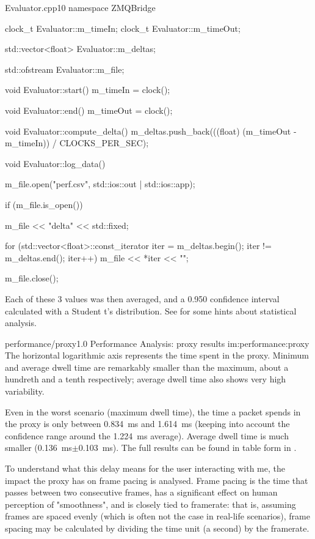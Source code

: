 \begin{codelist}{Evaluator.cpp}{10}
namespace ZMQBridge {

clock_t Evaluator::m_timeIn;
clock_t Evaluator::m_timeOut;

std::vector<float> Evaluator::m_deltas;

std::ofstream Evaluator::m_file;

void Evaluator::start() {
    m_timeIn = clock();
}

void Evaluator::end() {
    m_timeOut = clock();
}

void Evaluator::compute_delta() {
    m_deltas.push_back(((float) (m_timeOut - m_timeIn)) / CLOCKS_PER_SEC);
}

void Evaluator::log_data() {
    m_file.open("perf.csv", std::ios::out | std::ios::app);

    if (m_file.is_open()) {
        m_file << "delta\n"
               << std::fixed;

        for (std::vector<float>::const_iterator iter = m_deltas.begin(); iter != m_deltas.end(); iter++) {
            m_file << *iter << "\n";
        }
    }

    m_file.close();
}

}
\end{codelist}

\FLOATnoindent Each of these \num{3} values was then averaged, and a \num{0,950} confidence interval calculated with a Student t's distribution. See  for some hints about statistical analysis.

\begin{image}
	{performance/proxy}{1.0}
	{Performance Analysis: proxy results}
	{im:performance:proxy}
	{}
	{The horizontal logarithmic axis represents the time spent in the \gls{proxy}. Minimum and average dwell time are remarkably smaller than the maximum, about a hundreth and a tenth respectively; average dwell time also shows very high variability.}
\end{image}

Even in the worst scenario (maximum dwell time), the time a \gls{packet} spends in the \gls{proxy} is only between \SI{0,834}{\milli\second} and \SI{1,614}{\milli\second} (keeping into account the confidence range around the \SI{1,224}{\milli\second} average). Average dwell time is much smaller (\SI{0,136}{\milli\second}$\pm$\SI{0,103}{\milli\second}).  The full results can be found in table form in .

To understand what this delay means for the user interacting with \gls{me}, the impact the \gls{proxy} has on frame pacing is analysed. Frame pacing is the time that passes between two consecutive frames, has a significant effect on human perception of "smoothness", and is closely tied to \gls{framerate}: that is, assuming frames are spaced evenly (which is often not the case in real-life scenarios), frame spacing may be calculated by dividing the time unit (a second) by the \gls{framerate}.

